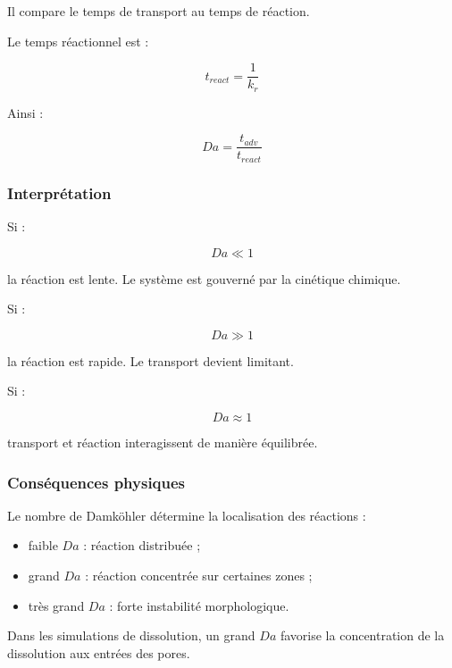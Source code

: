 \documentclass[12pt,a4paper]{report}
\begin{document}
Il compare le temps de transport au temps de réaction.

Le temps réactionnel est :

\begin{equation}
t_{react}
=
\frac{1}{k_r}
\end{equation}

Ainsi :

\begin{equation}
Da
=
\frac{t_{adv}}{t_{react}}
\end{equation}

\subsubsection{Interprétation}

Si :

\begin{equation}
Da \ll 1
\end{equation}

la réaction est lente. Le système est gouverné par la cinétique chimique.

Si :

\begin{equation}
Da \gg 1
\end{equation}

la réaction est rapide. Le transport devient limitant.

Si :

\begin{equation}
Da \approx 1
\end{equation}

transport et réaction interagissent de manière équilibrée.

\subsubsection{Conséquences physiques}

Le nombre de Damköhler détermine la localisation des réactions :

\begin{itemize}
\item faible $Da$ : réaction distribuée ;
\item grand $Da$ : réaction concentrée sur certaines zones ;
\item très grand $Da$ : forte instabilité morphologique.
\end{itemize}

Dans les simulations de dissolution, un grand $Da$ favorise la concentration de la dissolution aux entrées des pores.
\end{document}
